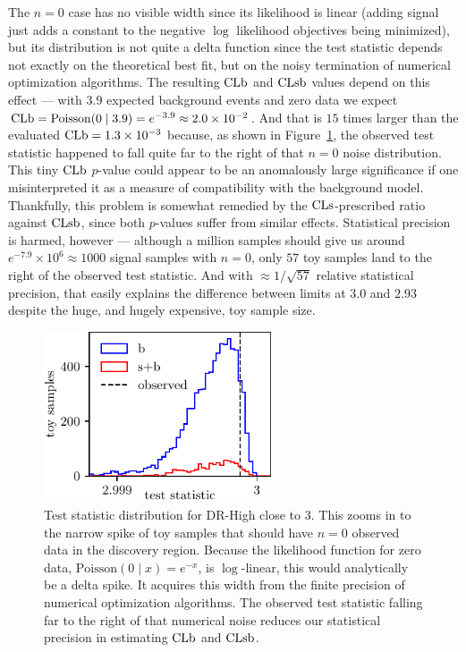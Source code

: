 The $n=0$ case has no visible width since its likelihood is linear
(adding signal just adds a constant to the negative $\log$ likelihood
objectives being minimized), but its distribution is not quite a delta function since the test
statistic depends not exactly on the theoretical best fit, but on the noisy
termination of numerical optimization algorithms.
The resulting $\mathrm{CLb}$ and $\mathrm{CLsb}$ values depend on this effect ---
with $3.9$ expected background events and zero data we expect
$\mathrm{CLb} = \mathrm{Poisson}(0\mid 3.9) = e^{-3.9} \approx 2.0\times 10^{-2}$.
And that is $15$ times larger than the evaluated $\mathrm{CLb} = 1.3\times 10^{-3}$
because, as shown in Figure~\ref{fig:2ljets_test_stat_distributions_drhigh_n0},
the observed test statistic happened to fall quite far to the right
of that $n=0$ noise distribution.
This tiny $\mathrm{CLb}$ $p$-value could appear to be an anomalously large
significance if one misinterpreted it as a measure of compatibility with the
background model.
Thankfully, this problem is somewhat remedied by the $\mathrm{CLs}$-prescribed ratio
against $\mathrm{CLsb}$, since both $p$-values suffer from similar effects.
Statistical precision is harmed, however --- although a million samples should
give us around $e^{-7.9} \times 10^6 \approx 1000$ signal samples with
$n=0$, only $57$ toy samples land to the right of the observed test statistic.
And with $\approx1/\sqrt{57}$ relative statistical precision, that easily
explains the difference between limits at $3.0$ and $2.93$ despite the huge,
and hugely expensive, toy sample size.

\begin{figure}[tp]
\centering
\includegraphics[width=0.6\textwidth]{figures/2ljets_drhigh_plot_n0.pdf}
\caption[
Test statistic distribution for DR-High close to $3$
]{%
Test statistic distribution for DR-High close to $3$.
This zooms in to the narrow spike of toy samples that should have $n=0$
observed data in the discovery region.
Because the likelihood function for zero data,
$\mathrm{Poisson}(0\mid x) = e^{-x}$, is $\log$-linear,
this would analytically be a delta spike.
It acquires this width from the finite precision of numerical optimization
algorithms.
The observed test statistic falling far to the right of that numerical noise
reduces our statistical precision in estimating $\mathrm{CLb}$ and $\mathrm{CLsb}$.
}
\label{fig:2ljets_test_stat_distributions_drhigh_n0}
\end{figure}

